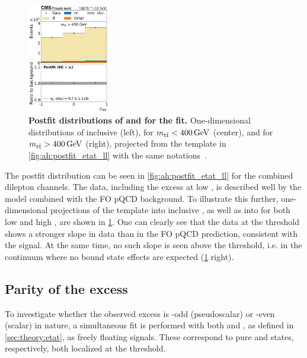 \begin{figure}[p]
    \hfill
    \includegraphics[width=0.32\textwidth]{figures/ah/prepost/EtaT_fit_s_ll_run2_both_chel_mttgt400.pdf}
    \caption{
        \label{fig:ah:postfit_etat_1d}
        \textbf{Postfit distributions of \mtt and \chel for the \etat fit.} One-dimensional distributions of inclusive \mtt (left), \chel for $\mtt < \SI{400}{\GeV}$ (center), and \chel for $\mtt > \SI{400}{\GeV}$ (right), projected from the \mttchelchan template in \cref{fig:ah:postfit_etat_ll} with the same notations~\cite{CMS:TOP-24-007}.
    }
    
\end{figure}

The postfit \mttchelchan distribution can be seen in \cref{fig:ah:postfit_etat_ll} for the combined dilepton channels. The data, including the excess at low \mtt, is described well by the \etat model combined with the FO pQCD background. To illustrate this further, one-dimensional projections of the \mttchelchan template into inclusive \mtt, as well as into \chel for both low and high \mtt, are shown in \cref{fig:ah:postfit_etat_1d}. One can clearly see that the data at the \ttbar threshold shows a stronger slope in data than in the FO pQCD prediction, consistent with the \etat signal.
At the same time, no such slope is seen above the threshold, i.e. in the \ttbar continuum where no \ttbar bound state effects are expected (\cref{fig:ah:postfit_etat_1d} right).


\subsection{Parity of the excess}
\label{sec:ah:parityscan}

To investigate whether the observed excess is \CP-odd (pseudoscalar) or \CP-even (scalar) in nature, a simultaneous fit is performed with both \etat and \chit, as defined in \cref{sec:theory:etat}, as freely floating signals. These correspond to pure  and  \ttbar states, respectively, both localized at the \ttbar threshold.

